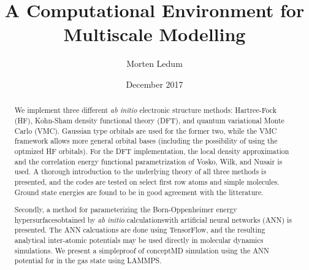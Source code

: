\documentclass[twoside,english]{uiofysmaster}
\author{Morten Ledum}
\title{A Computational Environment for Multiscale Modelling}
\date{December 2017}
\begin{document}
\newcommand{\mainfile}{}
\maketitle

\begin{abstract}
We implement three different \emph{ab initio} electronic structure methods: Hartree-Fock (HF), Kohn-Sham density functional theory (DFT), and quantum variational Monte Carlo (VMC). Gaussian type orbitals are used for the former two, while the VMC framework allows more general orbital bases (including the possibility of using the optmized HF orbitals). For the DFT implementation, the local density approximation and the correlation energy functional parametrization of Vosko, Wilk, and Nusair is used. A thorough introduction to the underlying theory of all three methods is presented, and the codes are tested on select first row atoms and simple molecules. Ground state energies are found to be in good agreement with the litterature. 

Secondly, a method for parameterizing the Born-Oppenheimer energy hypersurfaces\textemdash obtained by \emph{ab initio} calculations\textemdash with artificial neural networks (ANN) is presented. The ANN calcuations are done using TensorFlow, and the resulting analytical inter-atomic potentials may be used directly in molecular dynamics simulations. We present a simple\textemdash proof of concept\textemdash MD simulation using the ANN potential for  in the gas state using LAMMPS.
\end{abstract}


\end{document}
